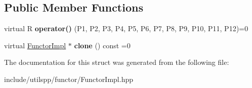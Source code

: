 \subsection*{Public Member Functions}
\begin{DoxyCompactItemize}
\item 
\hypertarget{structutilspp_1_1FunctorImpl_3_01R_00_01TYPE__LIST__12_07P1_00_01P2_00_01P3_00_01P4_00_01P5_00_0f8d0c7f7e384c45bf768264cb987d1dc_a08b5220edca2cc9ea88fcda264ece482}{virtual R {\bfseries operator()} (P1, P2, P3, P4, P5, P6, P7, P8, P9, P10, P11, P12)=0}\label{structutilspp_1_1FunctorImpl_3_01R_00_01TYPE__LIST__12_07P1_00_01P2_00_01P3_00_01P4_00_01P5_00_0f8d0c7f7e384c45bf768264cb987d1dc_a08b5220edca2cc9ea88fcda264ece482}

\item 
\hypertarget{structutilspp_1_1FunctorImpl_3_01R_00_01TYPE__LIST__12_07P1_00_01P2_00_01P3_00_01P4_00_01P5_00_0f8d0c7f7e384c45bf768264cb987d1dc_a9583c953b349595ccb736ad13bec1d6f}{virtual \hyperlink{structutilspp_1_1FunctorImpl}{Functor\-Impl} $\ast$ {\bfseries clone} () const =0}\label{structutilspp_1_1FunctorImpl_3_01R_00_01TYPE__LIST__12_07P1_00_01P2_00_01P3_00_01P4_00_01P5_00_0f8d0c7f7e384c45bf768264cb987d1dc_a9583c953b349595ccb736ad13bec1d6f}

\end{DoxyCompactItemize}


The documentation for this struct was generated from the following file\-:\begin{DoxyCompactItemize}
\item 
include/utilspp/functor/Functor\-Impl.\-hpp\end{DoxyCompactItemize}
